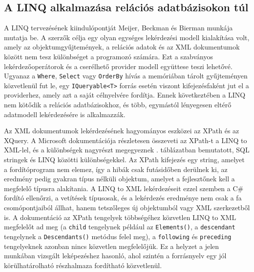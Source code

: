 \documentclass[a4paper,12pt]{article}
\begin{document}
\subsection{A LINQ alkalmazása relációs adatbázisokon túl}

A LINQ tervezésének kiindulópontját Meijer, Beckman és Bierman \cite{meijer2006linq} munkája mutatja be. A szerzők célja egy olyan egységes lekérdezési modell kialakítása volt, amely az objektumgyűjtemények, a relációs adatok és az XML dokumentumok között nem tesz különbséget a programozó számára. Ezt a szabványos lekérdezőoperátorok és a cserélhető provider modell együttese teszi lehetővé. Ugyanaz a \texttt{Where}, \texttt{Select} vagy \texttt{OrderBy} hívás a memóriában tárolt gyűjteményen közvetlenül fut le, egy \texttt{IQueryable<T>} forrás esetén viszont kifejezésfaként jut el a providerhez, amely azt a saját célnyelvére fordítja. Ennek következtében a LINQ nem kötődik a relációs adatbázisokhoz, és több, egymástól lényegesen eltérő adatmodell lekérdezésére is alkalmazzák.

Az XML dokumentumok lekérdezésének hagyományos eszközei az XPath és az XQuery. A Microsoft dokumentációja \cite{mslearn2024xpathlinq} részletesen összeveti az XPath-t a LINQ to XML-lel, és a különbségek nagyrészt megegyeznek . táblázatban bemutatott, SQL stringek és LINQ közötti különbségekkel. Az XPath kifejezés egy string, amelyet a fordítóprogram nem elemez, így a hibák csak futásidőben derülnek ki, az eredmény pedig gyakran típus nélküli objektum, amelyet a fejlesztőnek kell a megfelelő típusra alakítania. A LINQ to XML lekérdezéseit ezzel szemben a C\# fordító ellenőrzi, a vetítések típusosak, és a lekérdezés eredménye nem csak a fa csomópontjaiból állhat, hanem tetszőleges új objektumból vagy XML szerkezetből is. A dokumentáció az XPath tengelyek többségéhez közvetlen LINQ to XML megfelelőt ad meg (a \texttt{child} tengelynek például az \texttt{Elements()}, a \texttt{descendant} tengelynek a \texttt{Descendants()} metódus felel meg), a \texttt{following} és \texttt{preceding} tengelyeknek azonban nincs közvetlen megfelelőjük. Ez a helyzet a jelen munkában vizsgált leképezéshez hasonló, ahol szintén a forrásnyelv egy jól körülhatárolható részhalmaza fordítható közvetlenül.
\end{document}
